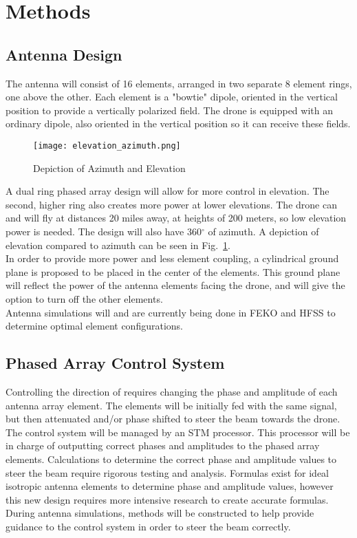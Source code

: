 \documentclass[UROP.tex]{subfiles}
\begin{document}
\bigskip
\section{\Large Methods}
\subsection{Antenna Design}
	The antenna will consist of 16 elements, arranged in two separate 8 element rings, one above the other.  Each element is a "bowtie" dipole, oriented in the vertical position to provide a vertically polarized field.  The drone is equipped with an ordinary dipole, also oriented in the vertical position so it can receive these fields.  
	
	\begin{figure}[H]
		\centering
		\texttt{[image: elevation\_azimuth.png]}
		\caption{ Depiction of Azimuth and Elevation \label{fig:elevation_azimuth}}
	\end{figure}
	
	A dual ring phased array design will allow for more control in elevation.  The second, higher ring also creates more power at lower elevations.  The drone can and will fly at distances 20 miles away, at heights of 200 meters, so low elevation power is needed.  The design will also have 360$^{\circ}$ of azimuth.  A depiction of elevation compared to azimuth can be seen in Fig.~\ref{fig:elevation_azimuth}. \\
	
	In order to provide more power and less element coupling, a cylindrical ground plane is proposed to be placed in the center of the elements. This ground plane will reflect the power of the antenna elements facing the drone, and will give the option to turn off the other elements.\\
	
	Antenna simulations will and are currently being done in FEKO and HFSS to determine optimal element configurations.
\subsection{Phased Array Control System}
	Controlling the direction of requires changing the phase and amplitude of each antenna array element.  The elements will be initially fed with the same signal, but then attenuated and/or phase shifted to steer the beam towards the drone.  \\
	
	The control system will be managed by an STM processor.  This processor will be in charge of outputting correct phases and amplitudes to the phased array elements.  Calculations to determine the correct phase and amplitude values to steer the beam require rigorous testing and analysis.  Formulas exist for ideal isotropic antenna elements to determine phase and amplitude values, however this new design requires more intensive research to create accurate formulas.  During antenna simulations, methods will be constructed to help provide guidance to the control system in order to steer the beam correctly. \\
	
\end{document}

